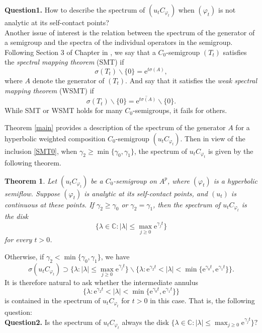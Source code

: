 \documentclass{amsart}
\theoremstyle{proclaim}
\newtheorem{theorem}{Theorem}[section]
\theoremstyle{fancyproclaim}
\theoremstyle{definition}
\theoremstyle{fancystatement}
\numberwithin{equation}{section}
\begin{document}
\noindent\textbf{Question1.} How to describe the spectrum of $(u_tC_{\varphi_t})$ when $(\varphi_t)$ is not analytic at its self-contact points?
\\

Another issue of interest is the relation between the spectrum of the generator of a semigroup and the spectra of the individual operators in the semigroup. Following Section 3 of Chapter \uppercase\expandafter{} in \cite{equ}, we say that a $C_0$-semigroup $(T_t)$ satisfies the \emph{spectral mapping theorem} (SMT) if
$$\sigma(T_t)\backslash\{0\} =  \mathrm{e}^{t\sigma(A)},$$
where $A$ denote the generator of $(T_t)$. And say that it satisfies the \emph{weak spectral mapping theorem} (WSMT) if
$$\sigma(T_t)\backslash\{0\} =\overline{  \mathrm{e}^{t\sigma(A)}}\backslash\{0\}.$$
While SMT or WSMT holds for many  $C_0$-semigroups, it fails for others. 

Theorem \ref{main} provides a description of the spectrum of the generator $A$ for a hyperbolic weighted composition $C_0$-semigroup $(u_tC_{\varphi_t})$. Then in view of the inclusion \eqref{SMT0},  when $\gamma_2\geq\min\{\gamma_0,\gamma_1\}$, the spectrum of $u_tC_{\varphi_t}$ is given by the following theorem. 

\begin{theorem}
Let $(u_tC_{\varphi_t})$ be a $C_0$-semigroup on $A^p$, where $(\varphi_t)$ is a hyperbolic semiflow. Suppose $(\varphi_t)$ is analytic at its self-contact points, and $(u_t)$ is continuous at these points. If  $\gamma_2\geq\gamma_0$ or $\gamma_2=\gamma_1$, then the spectrum of $u_tC_{\varphi_t}$ is the disk 
$$\bigl\{\lambda\in\mathbb{C} : |\lambda|\leq\max_{j\geq0}\mathrm{e}^{\gamma_jt}\bigr\}$$
for every $t>0$. 
\end{theorem}

Otherwise, if $\gamma_2<\min\{\gamma_0,\gamma_1\}$, we have
$$\sigma(u_tC_{\varphi_t})\supset\bigl\{\lambda : |\lambda|\leq\max_{j\geq0}\mathrm{e}^{\gamma_jt}\bigr\}\backslash\bigl\{\lambda : \mathrm{e}^{\gamma_2t}<|\lambda|<\min\{\mathrm{e}^{\gamma_0t},\mathrm{e}^{\gamma_1t}\}\bigr\}.$$
It is therefore natural to ask whether the intermediate annulus
$$\bigl\{\lambda : \mathrm{e}^{\gamma_2t}<|\lambda|<\min\{\mathrm{e}^{\gamma_0t},\mathrm{e}^{\gamma_1t}\}\bigr\}$$
is contained in the spectrum of $u_tC_{\varphi_t}$ for  $t>0$ in this case. That is, the following question:
\\

\noindent\textbf{Question2.} Is the spectrum of $u_tC_{\varphi_t}$ always the disk $\bigl\{\lambda\in\mathbb{C} : |\lambda|\leq\max_{j\geq0}\mathrm{e}^{\gamma_jt}\bigr\}?$
\\
\end{document}
